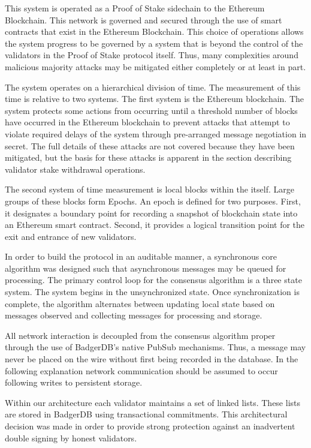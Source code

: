 This system is operated as a Proof of Stake sidechain to the Ethereum
Blockchain.
This network is governed and secured through the use of smart contracts
that exist in the Ethereum Blockchain.
This choice of operations allows the system progress to be governed by
a system that is beyond the control of the validators in the Proof of
Stake protocol itself.
Thus, many complexities around malicious majority attacks may be
mitigated either completely or at least in part.

The system operates on a hierarchical division of time.
The measurement of this time is relative to two systems.
The first system is the Ethereum blockchain.
The system protects some actions from occurring until a threshold
number of blocks have occurred in the Ethereum blockchain to prevent
attacks that attempt to violate required delays of the system through
pre-arranged message negotiation in secret.
The full details of these attacks are not covered because they have
been mitigated, but the basis for these attacks is apparent in the
section describing validator stake withdrawal operations.

The second system of time measurement is local blocks within the
\LayerTwoLong{} itself.
Large groups of these blocks form Epochs.
An epoch is defined for two purposes.
First, it designates a boundary point for recording a snapshot of
blockchain state into an Ethereum smart contract.
Second, it provides a logical transition point for the exit and
entrance of new validators.

In order to build the protocol in an auditable manner, a synchronous
core algorithm was designed such that asynchronous messages may be
queued for processing.
The primary control loop for the consensus algorithm is a three state
system.
The system begins in the unsynchronized state.
Once synchronization is complete, the algorithm alternates between
updating local state based on messages observed and collecting messages
for processing and storage.

All network interaction is decoupled from the consensus algorithm
proper through the use of BadgerDB's native PubSub mechanisms.
Thus, a message may never be placed on the wire without first being
recorded in the database.
In the following explanation network communication should be assumed to
occur following writes to persistent storage.

Within our architecture each validator maintains a set of linked lists.
These lists are stored in BadgerDB using transactional commitments.
This architectural decision was made in order to provide strong
protection against an inadvertent double signing by honest validators.

